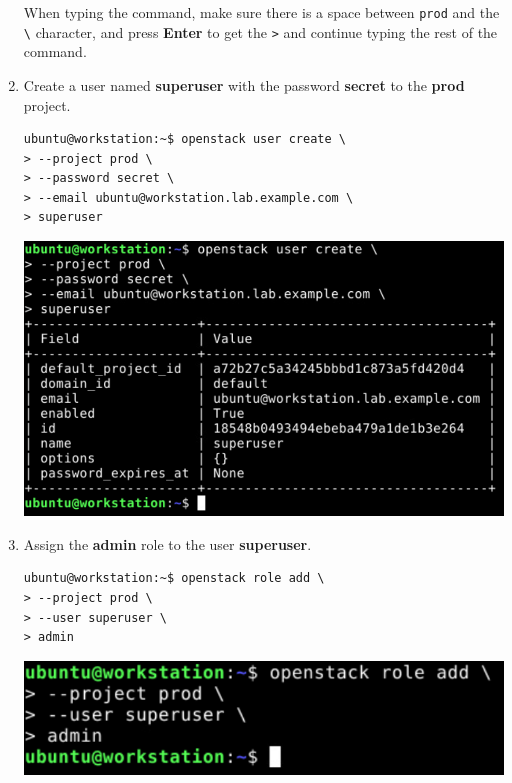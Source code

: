 \documentclass[letterpaper, 12pt]{article}
\begin{document}
\begin{enumerate}
\begin{tipbox}
    When typing the command, make sure there is a space between \texttt{prod} and the \texttt{\textbackslash}
    character, and press \textbf{Enter} to get the \texttt{>} and continue typing the rest of the command.
\end{tipbox}

    \item Create a user named \textbf{superuser} with the password \textbf{secret} to the \textbf{prod} project.
\begin{lstlisting}
ubuntu@workstation:~$ openstack user create \
> --project prod \
> --password secret \
> --email ubuntu@workstation.lab.example.com \
> superuser
\end{lstlisting}

\begin{center}
    \includegraphics[width=\linewidth]{images/part1/step5.png}
\end{center}

    \item Assign the \textbf{admin} role to the user \textbf{superuser}.
\begin{lstlisting}
ubuntu@workstation:~$ openstack role add \
> --project prod \
> --user superuser \
> admin
\end{lstlisting}

    \begin{center}
        \includegraphics[width=\linewidth]{images/part1/step6.png}
    \end{center}


\end{enumerate}
\end{document}
